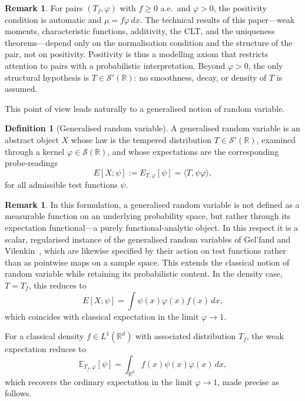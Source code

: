 \documentclass[12pt]{article}
\theoremstyle{definition}
\newtheorem{definition}[theorem]{Definition}
\newtheorem{remark}[theorem]{Remark}
\newcommand{\R}{\mathbb{R}}
\newcommand{\E}{\mathbb{E}}
\begin{document}
\begin{remark}\label{rem:positivity-strong}
For pairs $(T_f,\varphi)$ with $f\ge 0$ a.e.\ and $\varphi>0$, the
positivity condition is automatic and $\mu = f\varphi\,dx$.  The
technical results of this paper---weak moments, characteristic
functions, additivity, the CLT, and the uniqueness theorems---depend
only on the normalisation condition and the structure of the pair,
not on positivity.  Positivity is thus a modelling axiom that
restricts attention to pairs with a probabilistic interpretation.
Beyond $\varphi>0$, the only structural hypothesis is $T\in\mathcal{S}'(\R)$:
no smoothness, decay, or density of $T$ is assumed.
\end{remark}

This point of view leads naturally to a generalised notion of random variable.

\begin{definition}[Generalised random variable]
A generalised random variable is an abstract object \(X\) whose law is the
tempered distribution \(T \in \mathcal{S}'(\mathbb{R})\), examined through a
kernel \(\varphi \in \mathcal{S}(\mathbb{R})\), and whose expectations are the
corresponding probe-readings
\[
E[X;\psi] := E_{T,\varphi}[\psi] = \langle T, \psi \varphi \rangle,
\]
for all admissible test functions \(\psi\).
\end{definition}

\begin{remark}
In this formulation, a generalised random variable is not defined as a
measurable function on an underlying probability space, but rather through
its expectation functional---a purely functional-analytic object. In this
respect it is a scalar, regularised instance of the generalised random
variables of Gel'fand and Vilenkin~\cite{Gelfand1964}, which are likewise
specified by their action on test functions rather than as pointwise maps on
a sample space. This extends the classical notion of random
variable while retaining its probabilistic content. In the density case,
\(T = T_f\), this reduces to
\[
E[X;\psi] = \int \psi(x)\varphi(x) f(x)\,dx,
\]
which coincides with classical expectation in the limit \(\varphi \to 1\).
\end{remark}

For a classical density $f\in L^1(\R^d)$ with associated distribution $T_f$, the weak expectation reduces to
\[
\E_{T_f,\varphi}[\psi] = \int_{\R^d} f(x)\psi(x)\varphi(x)\,dx,
\]
which recovers the ordinary expectation in the limit $\varphi\to 1$, made
precise as follows.
\end{document}
